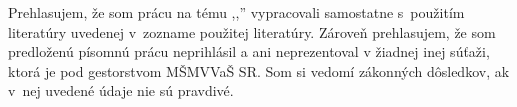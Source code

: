 %
%

Prehlasujem, že som prácu na tému ,,\nazovprace'' vypracovali samostatne
s~použitím literatúry uvedenej v~zozname použitej literatúry. Zároveň prehlasujem,
že som predloženú písomnú prácu neprihlásil a ani neprezentoval v žiadnej inej súťaži,
ktorá je pod gestorstvom MŠMVVaŠ SR. Som si vedomí zákonných dôsledkov,
ak v~nej uvedené údaje nie sú pravdivé.
